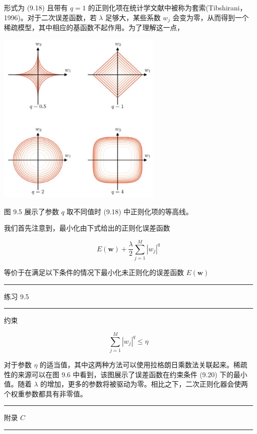 \documentclass[10pt]{article}
\newcommand{\HRule}{\begin{center}\rule{0.9\linewidth}{0.2mm}\end{center}}
\begin{document}
形式为 (9.18) 且带有 \(q = 1\) 的正则化项在统计学文献中被称为套索(Tibshirani，1996)。对于二次误差函数，若 \(\lambda\) 足够大，某些系数 \({w}_{j}\) 会变为零，从而得到一个稀疏模型，其中相应的基函数不起作用。为了理解这一点，

\begin{center}
\includegraphics[max width=0.6\textwidth]{images/0194e279-9b28-703a-88f4-c3ac21e2010d_284_687_349_782_829_0.jpg}
\end{center}
\hspace*{3em} 

图 9.5 展示了参数 \(q\) 取不同值时 (9.18) 中正则化项的等高线。

我们首先注意到，最小化由下式给出的正则化误差函数

\[
E\left( \mathbf{w}\right)  + \frac{\lambda }{2}\mathop{\sum }\limits_{{j = 1}}^{M}{\left| {w}_{j}\right| }^{q} \tag{9.19}
\]

等价于在满足以下条件的情况下最小化未正则化的误差函数 \(E\left( \mathbf{w}\right)\)

\HRule

练习 9.5

\HRule

约束

\[
\mathop{\sum }\limits_{{j = 1}}^{M}{\left| {w}_{j}\right| }^{q} \leq  \eta  \tag{9.20}
\]

对于参数 \(\eta\) 的适当值，其中这两种方法可以使用拉格朗日乘数法关联起来。稀疏性的来源可以在图 9.6 中看到，该图展示了误差函数在约束条件 (9.20) 下的最小值。随着 \(\lambda\) 的增加，更多的参数将被驱动为零。相比之下，二次正则化器会使两个权重参数都具有非零值。

\HRule

附录 \(C\)

\HRule
\end{document}
